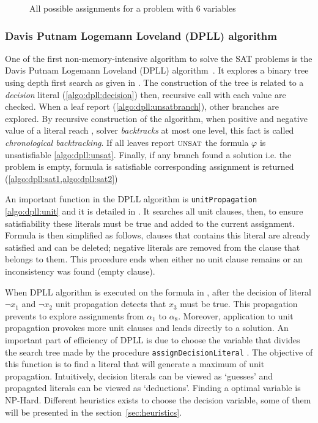 \begin{figure}[!htbp]
 \centering
 
 \caption{All possible assignments for a problem with 6 variables}
 \label{fig:naive_algo}
\end{figure}

\subsubsection{Davis Putnam Logemann Loveland (DPLL) algorithm}\label{sec:dpll}
One of the first non-memory-intensive algorithm to solve the SAT problems is 
the Davis Putnam Logemann Loveland (DPLL) algorithm~\cite{dpll_62}. 
It explores a binary tree using depth first search as given in .
The construction of the tree is related to a \emph{decision} literal (\cref{algo:dpll:decision}) then,
recursive call with each value are checked.
When a leaf report \unsat (\cref{algo:dpll:unsatbranch}), other branches are explored.
By recursive construction of the algorithm, when positive and negative value of a literal reach \unsat,
solver \emph{backtracks} at most one level, this fact is called \emph{chronological backtracking}.
If all leaves report $\textsc{unsat}$  the formula $\varphi$ is unsatisfiable \cref{algo:dpll:unsat}.
Finally, if any branch found a solution  i.e. the problem is empty,
formula is satisfiable corresponding assignment is returned (\cref{algo:dpll:sat1,algo:dpll:sat2})

An important function in the DPLL algorithm is \texttt{unitPropagation} \cref{algo:dpll:unit} and
it is detailed in . It searches all unit clauses, then, to ensure satisfiability these literals must be true
and added to the current assignment. Formula is then simplified as follows, clauses that contains this literal are already satisfied
and can be deleted; negative literals are removed from the clause that belongs to them.
This procedure ends when either no unit clause remains or an inconsistency was found (empty clause).


When DPLL algorithm is executed on the formula in , after the decision of literal
$\neg x_1$ and $\neg x_2$ unit propagation detects that $x_3$ must be true. This propagation prevents to 
explore assignments from $\alpha_1 $ to $\alpha_{8}$. Moreover, application to unit propagation provokes more unit clauses
and leads directly to a solution. 
An important part of efficiency of DPLL is due to choose the variable that divides the search tree made by
the procedure \texttt{assignDecisionLiteral} . The objective of this function 
is to find a literal that will generate a maximum of unit propagation. Intuitively, decision literals 
can be viewed as ‘guesses’ and propagated literals can be viewed as ‘deductions’. Finding a optimal variable
is NP-Hard. Different heuristics exists to choose the decision variable,
some of them will be presented in the section~\ref{sec:heuristics}.

